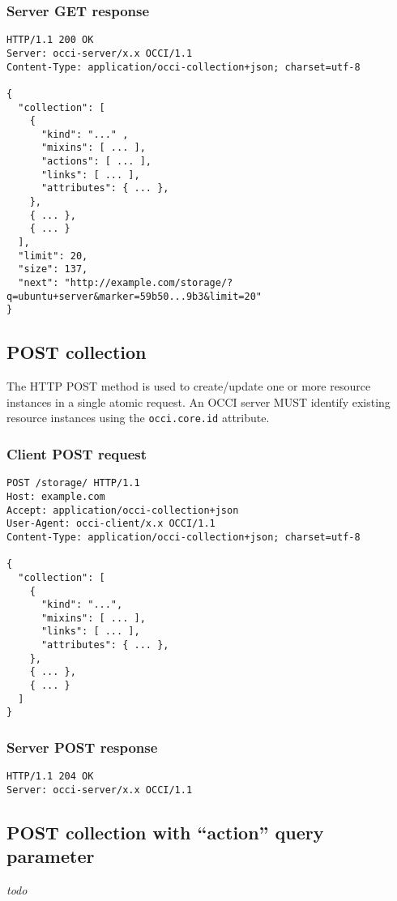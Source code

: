 \documentclass[10pt,a4paper]{article}
\begin{document}
\subsubsection{Server GET response}
\begin{verbatim}
HTTP/1.1 200 OK
Server: occi-server/x.x OCCI/1.1
Content-Type: application/occi-collection+json; charset=utf-8

{
  "collection": [
    {
      "kind": "..." ,
      "mixins": [ ... ],
      "actions": [ ... ],
      "links": [ ... ],
      "attributes": { ... },
    },
    { ... },
    { ... }
  ],
  "limit": 20,
  "size": 137,
  "next": "http://example.com/storage/?q=ubuntu+server&marker=59b50...9b3&limit=20"
}
\end{verbatim}


\subsection{POST collection}
The HTTP POST method is used to create/update one or more resource instances in
a single atomic request. An OCCI server MUST identify existing resource instances
using the {\tt occi.core.id} attribute.

\subsubsection{Client POST request}
\begin{verbatim}
POST /storage/ HTTP/1.1
Host: example.com
Accept: application/occi-collection+json
User-Agent: occi-client/x.x OCCI/1.1
Content-Type: application/occi-collection+json; charset=utf-8

{
  "collection": [
    {
      "kind": "...",
      "mixins": [ ... ],
      "links": [ ... ],
      "attributes": { ... },
    },
    { ... },
    { ... }
  ]
}
\end{verbatim}

\subsubsection{Server POST response}
\begin{verbatim}
HTTP/1.1 204 OK
Server: occi-server/x.x OCCI/1.1
\end{verbatim}

\subsection{POST collection with ``action'' query parameter}
{\em todo}
\end{document}
